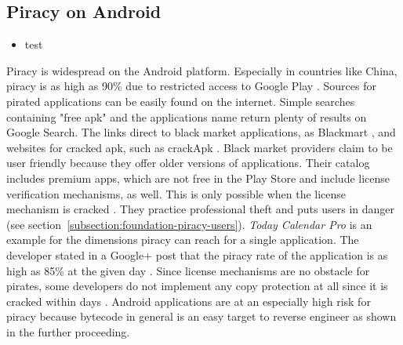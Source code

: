 \subsection{Piracy on Android} \label{subsection:foundation-piracy-android}
\begin{itemize}
    \item test
\end{itemize}
Piracy is widespread on the Android platform. Especially in countries like China, piracy is as high as 90\% due to restricted access to Google Play \cite{piracyRate}.
Sources for pirated applications can be easily found on the internet.
Simple searches containing "free apk" and the applications name return plenty of results on Google Search.
The links direct to black market applications, as Blackmart \cite{blackmartStore}, and websites for cracked \gls{apk}, such as crackApk \cite{crackApk}.
Black market providers claim to be user friendly because they offer older versions of applications.
Their catalog includes premium apps, which are not free in the Play Store and include license verification mechanisms, as well.
This is only possible when the license mechanism is cracked \cite{apksfree}.
They practice professional theft and puts users in danger (see section~\ref{subsection:foundation-piracy-users}).
\newline
\textit{Today Calendar Pro} is an example for the dimensions piracy can reach for a single application.
The developer stated in a Google+ post that the piracy rate of the application is as high as 85\% at the given day \cite{xdaPiracy} \cite{developersPiracy}.
\newline
Since license mechanisms are no obstacle for pirates, some developers do not implement any copy protection at all since it is cracked within days \cite{recodeMonument}.
Android applications are at an especially high risk for piracy because bytecode in general is an easy target to reverse engineer as shown in the further proceeding.
